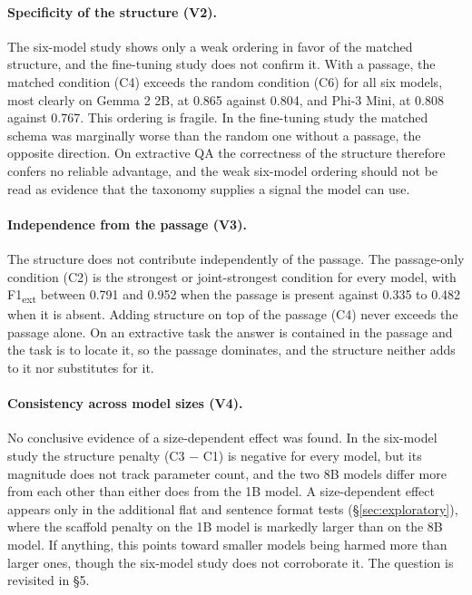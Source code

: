 \documentclass{article}
\begin{document}
\paragraph{Specificity of the structure (V2).}
The six-model study shows only a weak ordering in favor of the matched structure, and the fine-tuning study does not confirm it. With a passage, the matched condition (C4) exceeds the random condition (C6) for all six models, most clearly on Gemma 2 2B, at 0.865 against 0.804, and Phi-3 Mini, at 0.808 against 0.767. This ordering is fragile. In the fine-tuning study the matched schema was marginally worse than the random one without a passage, the opposite direction. On extractive QA the correctness of the structure therefore confers no reliable advantage, and the weak six-model ordering should not be read as evidence that the taxonomy supplies a signal the model can use.

\paragraph{Independence from the passage (V3).}
The structure does not contribute independently of the passage. The passage-only condition (C2) is the strongest or joint-strongest condition for every model, with F1\textsubscript{ext} between 0.791 and 0.952 when the passage is present against 0.335 to 0.482 when it is absent. Adding structure on top of the passage (C4) never exceeds the passage alone. On an extractive task the answer is contained in the passage and the task is to locate it, so the passage dominates, and the structure neither adds to it nor substitutes for it.

\paragraph{Consistency across model sizes (V4).}
No conclusive evidence of a size-dependent effect was found. In the six-model study the structure penalty (C3 $-$ C1) is negative for every model, but its magnitude does not track parameter count, and the two 8B models differ more from each other than either does from the 1B model. A size-dependent effect appears only in the additional flat and sentence format tests (\S\ref{sec:exploratory}), where the scaffold penalty on the 1B model is markedly larger than on the 8B model. If anything, this points toward smaller models being harmed more than larger ones, though the six-model study does not corroborate it. The question is revisited in \S5.
\end{document}
